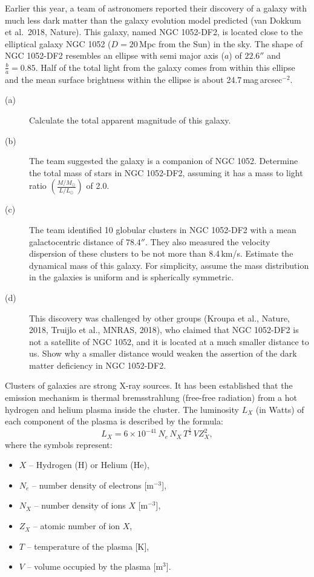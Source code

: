 Earlier this year, a team of astronomers reported their discovery of a galaxy
with much less dark matter than the galaxy evolution model predicted (van
Dokkum et al.\ 2018, Nature). This galaxy, named NGC 1052-DF2, is located
close to the elliptical galaxy NGC 1052 ($D = 20$\,Mpc from the Sun) in the
sky. The shape of NGC 1052-DF2 resembles an ellipse with semi major axis ($a$)
of $22.6''$ and $\frac{b}{a} = 0.85$. Half of the total light from the galaxy
comes from within this ellipse and the mean surface brightness within the
ellipse is about 24.7\,mag\,arcsec$^{-2}$.

\begin{description}
\item[(a)] Calculate the total apparent magnitude of this galaxy.
\item[(b)] The team suggested the galaxy is a companion of NGC 1052.
  Determine the total mass of stars in NGC 1052-DF2, assuming it has a mass to
  light ratio $\left(\frac{M/M_\odot}{L/L_\odot}\right)$ of 2.0.
\item[(c)] The team identified 10 globular clusters in NGC 1052-DF2 with a
  mean galactocentric distance of $78.4''$. They also measured the velocity
  dispersion of these clusters to be not more than 8.4\,km/s. Estimate the
  dynamical mass of this galaxy. For simplicity, assume the mass distribution
  in the galaxies is uniform and is spherically symmetric.
\item[(d)] This discovery was challenged by other groups (Kroupa et al.,
  Nature, 2018, Truijlo et al., MNRAS, 2018), who claimed that NGC 1052-DF2 is
  not a satellite of NGC 1052, and it is located at a much smaller distance to
  us. Show why a smaller distance would weaken the assertion of the dark
  matter deficiency in NGC 1052-DF2.
\end{description}

Clusters of galaxies are strong X-ray sources. It has been established that
the emission mechanism is thermal bremsstrahlung (free-free radiation) from a
hot hydrogen and helium plasma inside the cluster. The luminosity $L_X$ (in
Watts) of each component of the plasma is described by the formula:
\[ L_X = 6 \times 10^{-41}\, N_e\, N_X\, T^{\frac{1}{2}}\, V Z_X^2, \]
where the symbols represent:
\begin{itemize}
\item $X$ -- Hydrogen (H) or Helium (He),
\item $N_e$ -- number density of electrons [$\mathrm{m}^{-3}$],
\item $N_X$ -- number density of ions $X$ [$\mathrm{m}^{-3}$],
\item $Z_X$ -- atomic number of ion $X$,
\item $T$ -- temperature of the plasma [K],
\item $V$ -- volume occupied by the plasma [$\mathrm{m}^3$].
\end{itemize}

